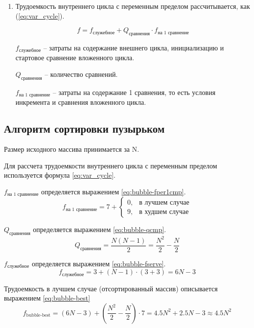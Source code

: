 \begin{enumerate}
	\item Трудоемкость внутреннего цикла с переменным пределом рассчитывается, как (\ref{eq:var_cycle}).

	\begin{equation}
		\label{eq:var_cycle}
		f = f_{\text{служебное}} + Q_{\text{сравнения}} \cdot f_{\text{на 1 сравнение}}
	\end{equation}
	
	$f_{\text{служебное}}$ -- затраты на содержание внешнего цикла, инициализацию и стартовое сравнение вложенного 
	цикла.
	
	$Q_{\text{сравнения}}$ -- количество сравнений. 
	
	$f_{\text{на 1 сравнение}}$ -- затраты на содержание 1 сравнения, то есть условия инкремента и сравнения вложенного цикла.
\end{enumerate}


\subsection{Алгоритм сортировки пузырьком}

Размер исходного массива принимается за N. 

Для рассчета трудоемкости внутреннего цикла с переменным пределом используется формула \ref{eq:var_cycle}.

$f_{\text{на 1 сравнение}}$ определяется выражением \ref{eq:bubble-fper1cmp}.
\begin{equation}
	\label{eq:bubble-fper1cmp}
	f_{\text{на 1 сравнение}} = 7 + \begin{cases}
	0, & \text{в лучшем случае}\\
	9, & \text{в худшем случае}
	\end{cases}
\end{equation}

$Q_{\text{сравнения}}$ определяется выражением \ref{eq:bubble-qcmp}.
\begin{equation}
	\label{eq:bubble-qcmp}
	Q_{\text{сравнения}} = \frac{N(N-1)}{2} = \frac{N^{2}}{2} - \frac{N}{2}
\end{equation}

$f_{\text{служебное}}$ определяется выражением \ref{eq:bubble-fserve}.
\begin{equation}
	\label{eq:bubble-fserve}
	f_{\text{служебное}} = 3 + (N - 1) \cdot (3 + 3) = 6N - 3
\end{equation}


Трудоемкость в лучшем случае (отсортированный массив) описывается выражением \ref{eq:bubble-best}
\begin{equation}
	\label{eq:bubble-best}
	f_{\text{bubble-best}} = (6N - 3) + (\frac{N^{2}}{2} - \frac{N}{2})\cdot7 = 4.5N^{2}+2.5N-3 \approx 4.5N^{2}
\end{equation}


